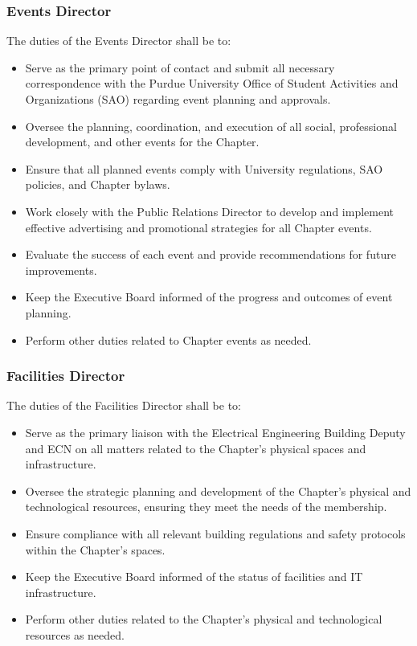 \documentclass[10pt, oneside]{article}
\begin{document}
\subsubsection{Events Director}
The duties of the Events Director shall be to:
\begin{itemize}
    \item Serve as the primary point of contact and submit all necessary correspondence with the Purdue University Office of Student Activities and Organizations (SAO) regarding event planning and approvals.
    \item Oversee the planning, coordination, and execution of all social, professional development, and other events for the Chapter.
    \item Ensure that all planned events comply with University regulations, SAO policies, and Chapter bylaws.
    \item Work closely with the Public Relations Director to develop and implement effective advertising and promotional strategies for all Chapter events.
    \item Evaluate the success of each event and provide recommendations for future improvements.
    \item Keep the Executive Board informed of the progress and outcomes of event planning.
    \item Perform other duties related to Chapter events as needed.
\end{itemize}
\subsubsection{Facilities Director}
The duties of the Facilities Director shall be to:
\begin{itemize}
    \item Serve as the primary liaison with the Electrical Engineering Building Deputy and ECN on all matters related to the Chapter's physical spaces and infrastructure.
    \item Oversee the strategic planning and development of the Chapter's physical and technological resources, ensuring they meet the needs of the membership.
    \item Ensure compliance with all relevant building regulations and safety protocols within the Chapter's spaces.
    \item Keep the Executive Board informed of the status of facilities and IT infrastructure.
    \item Perform other duties related to the Chapter's physical and technological resources as needed.
\end{itemize}
\end{document}
